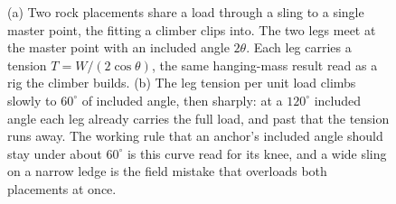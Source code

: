 \begin{figure}[htbp]
\caption[A two-point climbing anchor and its angle penalty]{(a) Two rock
placements share a load through a sling to a single master point, the fitting
a climber clips into. The two legs meet at the master point with an included
angle $2\theta$. Each leg carries a tension $T = W/(2\cos\theta)$, the same
hanging-mass result read as a rig the climber builds. (b) The leg tension per
unit load climbs slowly to $60^{\circ}$ of included angle, then sharply: at a
$120^{\circ}$ included angle each leg already carries the full load, and past
that the tension runs away. The working rule that an anchor's included angle
should stay under about $60^{\circ}$ is this curve read for its knee, and a
wide sling on a narrow ledge is the field mistake that overloads both
placements at once.}
\label{fig:vol03ch01:climbing-anchor}
\end{figure}
